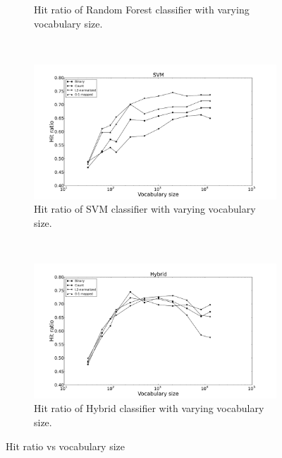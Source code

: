 \begin{figure}[H]
\begin{subfigure}[b]{\figwidth}
		\caption{Hit ratio of Random Forest classifier with varying vocabulary size.}
		\label{fig:hitrate-rf}
	\end{subfigure}
	~
	\begin{subfigure}[b]{\figwidth}
		\includegraphics[width=\textwidth]{img/SVM-hitrate-eps-converted-to.pdf}
		\caption{Hit ratio of SVM classifier with varying vocabulary size.}
		\label{fig:hitrate-svm}
	\end{subfigure}
	\\
	\begin{subfigure}[b]{\figwidth}
		\includegraphics[width=\textwidth]{img/Hybrid-hitrate-eps-converted-to.pdf}
		\caption{Hit ratio of Hybrid classifier with varying vocabulary size.}
		\label{fig:hitrate-hybrid}
	\end{subfigure}
	\caption{Hit ratio vs vocabulary size}
	\label{fig:hitrate}
\end{figure}


